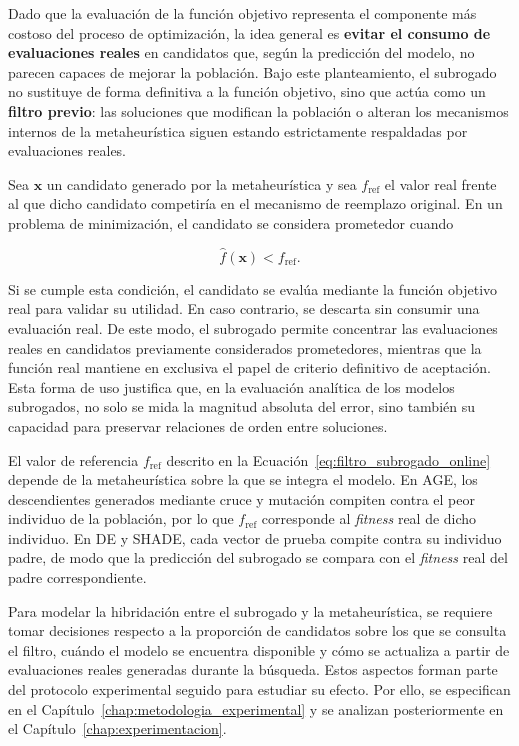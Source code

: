 Dado que la evaluación de la función objetivo representa el componente más
costoso del proceso de optimización, la idea general es \textbf{evitar el consumo de evaluaciones reales} en candidatos que, según la predicción del modelo, no parecen capaces de mejorar la población. Bajo este planteamiento, el subrogado no sustituye de forma definitiva a la función objetivo, sino que actúa como un \textbf{filtro previo}: las soluciones que modifican la población o alteran los mecanismos internos de la metaheurística siguen estando estrictamente respaldadas por evaluaciones reales.

Sea \(\mathbf{x}\) un candidato generado por la metaheurística y sea \(f_{\text{ref}}\) el valor real frente al que dicho candidato competiría en el mecanismo de reemplazo original. En un problema de minimización, el candidato se considera prometedor cuando

\begin{equation}
    \hat{f}(\mathbf{x}) < f_{\text{ref}}.
    \label{eq:filtro_subrogado_online}
\end{equation}

Si se cumple esta condición, el candidato se evalúa mediante la función objetivo
real para validar su utilidad. En caso contrario, se descarta sin consumir una
evaluación real. De este modo, el subrogado permite concentrar las evaluaciones
reales en candidatos previamente considerados prometedores, mientras que la
función real mantiene en exclusiva el papel de criterio definitivo de
aceptación. Esta forma de uso justifica que, en la evaluación analítica de los modelos subrogados, no solo se mida la magnitud absoluta del error, sino también su capacidad para preservar relaciones de orden entre soluciones.

El valor de referencia \(f_{\text{ref}}\) descrito en la Ecuación~\ref{eq:filtro_subrogado_online} depende de la metaheurística sobre la
que se integra el modelo. En AGE, los descendientes generados mediante cruce y mutación compiten contra el peor individuo de la población, por lo que \(f_{\text{ref}}\) corresponde al \textit{fitness} real de dicho individuo. En DE y SHADE, cada vector de prueba compite contra su individuo padre, de modo que la predicción del subrogado se compara con el \textit{fitness} real del padre correspondiente.

Para modelar la hibridación entre el subrogado y la metaheurística, se requiere tomar decisiones respecto a la proporción de candidatos sobre los que se consulta el filtro, cuándo el modelo se encuentra disponible y cómo se actualiza a partir de evaluaciones reales generadas durante la búsqueda. Estos aspectos forman parte del protocolo experimental seguido para estudiar su efecto. Por ello, se especifican en el
Capítulo~\ref{chap:metodologia_experimental} y se analizan posteriormente en el Capítulo~\ref{chap:experimentacion}.




